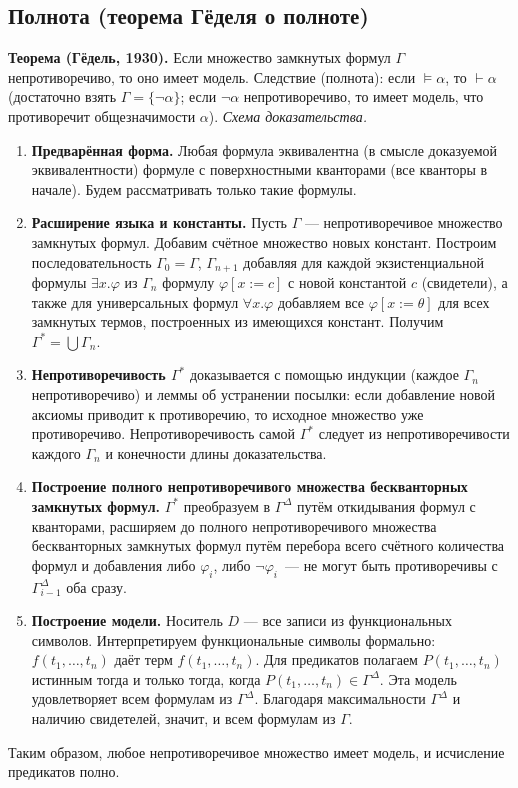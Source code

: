 \documentclass[10pt]{article}
\begin{document}
\subsection{Полнота (теорема Гёделя о полноте)}
\textbf{Теорема (Гёдель, 1930).} Если множество замкнутых формул $\Gamma$ непротиворечиво, то оно имеет модель.
Следствие (полнота): если $\models\alpha$, то $\vdash\alpha$ (достаточно взять $\Gamma=\{\neg\alpha\}$; если $\neg\alpha$ непротиворечиво, то имеет модель, что противоречит общезначимости $\alpha$).
\emph{Схема доказательства.}
\begin{enumerate}
  \item \textbf{Предварённая форма.} Любая формула эквивалентна (в смысле доказуемой эквивалентности) формуле с поверхностными кванторами (все кванторы в начале). Будем рассматривать только такие формулы.
  \item \textbf{Расширение языка и константы.} Пусть $\Gamma$ — непротиворечивое множество замкнутых формул. Добавим счётное множество новых констант. Построим последовательность $\Gamma_0=\Gamma$, $\Gamma_{n+1}$ добавляя для каждой экзистенциальной формулы $\exists x.\varphi$ из $\Gamma_n$ формулу $\varphi[x:=c]$ с новой константой $c$ (свидетели), а также для универсальных формул $\forall x.\varphi$ добавляем все $\varphi[x:=\theta]$ для всех замкнутых термов, построенных из имеющихся констант. Получим $\Gamma^* = \bigcup\Gamma_n$. 
  \item \textbf{Непротиворечивость $\Gamma^*$} доказывается с помощью индукции (каждое $\Gamma_n$ непротиворечиво) и леммы об устранении посылки: если добавление новой аксиомы приводит к противоречию, то исходное множество уже противоречиво. Непротиворечивость самой $\Gamma^*$ следует из непротиворечивости каждого $\Gamma_n$ и конечности длины доказательства.
  \item \textbf{Построение полного непротиворечивого множества бескванторных замкнутых формул.} $\Gamma^*$ преобразуем в $\Gamma^\Delta$ путём откидывания формул с кванторами, расширяем до полного непротиворечивого множества бескванторных замкнутых формул путём перебора всего счётного количества формул и добавления либо $\varphi_i$, либо $\neg\varphi_i$~--- не могут быть противоречивы с $\Gamma^\Delta_{i-1}$ оба сразу.
  \item \textbf{Построение модели.} Носитель $D$ — все записи из функциональных символов. Интерпретируем функциональные символы формально: $f(t_1,\dots,t_n)$ даёт терм $f(t_1,\dots,t_n)$. Для предикатов полагаем $P(t_1,\dots,t_n)$ истинным тогда и только тогда, когда $P(t_1,\dots,t_n)\in\Gamma^\Delta$. Эта модель удовлетворяет всем формулам из $\Gamma^\Delta$. Благодаря максимальности $\Gamma^\Delta$ и наличию свидетелей, значит, и всем формулам из $\Gamma$.
\end{enumerate}
Таким образом, любое непротиворечивое множество имеет модель, и исчисление предикатов полно.
\end{document}
